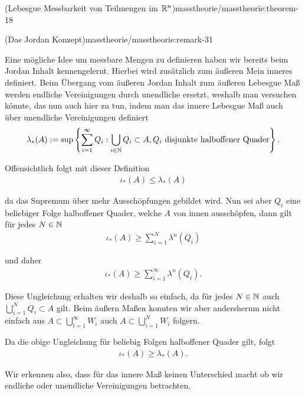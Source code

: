 \begin{theorem}{(Lebesgue Messbarkeit von Teilmengen im \protect\(\mathbb{R}^n\protect\))}{masstheorie/masstheorie:theorem-18}
\begin{remark}{(Das Jordan Konzept)}{masstheorie/masstheorie:remark-31}
\par
Eine mögliche Idee um messbare Mengen zu definieren haben wir bereits beim Jordan Inhalt kennengelernt. Hierbei wird zusätzlich zum äußeren Mein inneres definiert. Beim Übergang vom äußeren Jordan Inhalt zum äußeren Lebesgue Maß werden endliche Vereinigungen durch unendliche ersetzt, weshalb man versuchen könnte, das nun auch hier zu tun, indem man das innere Lebesgue Maß auch über unendliche Vereinigungen definiert
\begin{align*}
\lambda_\ast(A) := \sup\left\{\sum_{i=1}^\infty Q_i: \bigcup_{i\in\mathbb{N}} Q_i \subset A, Q_i\text{ disjunkte halboffener Quader}\right\}.
\end{align*}
\par
Offensichtlich folgt mit dieser Definition
\begin{align*}
\iota_\ast(A)\leq \lambda_\ast(A)
\end{align*}
\par
da das Supremum über mehr Ausschöpfungen gebildet wird. Nun sei aber \(Q_i\) eine beliebiger Folge halboffener Quader, welche \(A\) von innen ausschöpfen, dann gilt für jedes \(N\in\mathbb{N}\)
\begin{align*}
\iota_\ast(A) \geq \sum_{i=1}^N \lambda^n(Q_i)
\end{align*}
\par
und daher
\begin{align*}
\iota_\ast(A)\geq \sum_{i=1}^\infty \lambda^n(Q_i).
\end{align*}
\par
Diese Ungleichung erhalten wir deshalb so einfach, da für jedes \(N\in\mathbb{N}\) auch \(\bigcup_{i=1}^N Q_i\subset A\) gilt. Beim äußern Maßen konnten wir aber andersherum nicht einfach aus \(A\subset \bigcup_{i=1}^\infty W_i\) auch \(A\subset \bigcup_{i=1}^N W_i\) folgern.

\par
Da die obige Ungleichung für beliebig Folgen halboffener Quader gilt, folgt
\begin{align*}
\iota_\ast(A) \geq \lambda_\ast(A).
\end{align*}
\par
Wir erkennen also, dass für das innere Maß keinen Unterschied macht ob wir endliche oder unendliche Vereinigungen betrachten.


\end{remark}
\end{theorem}
